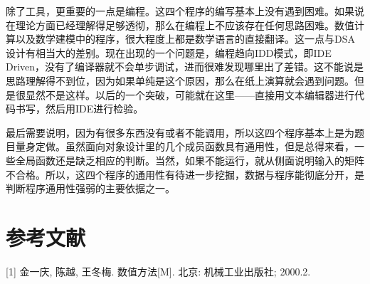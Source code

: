 除了工具，更重要的一点是编程。这四个程序的编写基本上没有遇到困难。如果说在理论方面已经理解得足够透彻，那么在编程上不应该存在任何思路困难。数值计算以及数学建模中的程序，很大程度上都是数学语言的直接翻译。这一点与DSA设计有相当大的差别。现在出现的一个问题是，编程趋向IDD模式，即IDE Driven，没有了编译器就不会单步调试，进而很难发现哪里出了差错。这不能说是思路理解得不到位，因为如果单纯是这个原因，那么在纸上演算就会遇到问题。但是很显然不是这样。以后的一个突破，可能就在这里——直接用文本编辑器进行代码书写，然后用IDE进行检验。

最后需要说明，因为有很多东西没有或者不能调用，所以这四个程序基本上是为题目量身定做。虽然面向对象设计里的几个成员函数具有通用性，但是总得来看，一些全局函数还是缺乏相应的判断。当然，如果不能运行，就从侧面说明输入的矩阵不合格。所以，这四个程序的通用性有待进一步挖掘，数据与程序能彻底分开，是判断程序通用性强弱的主要依据之一。


\section{参考文献}

[1] 金一庆, 陈越, 王冬梅. 数值方法[M]. 北京: 机械工业出版社; 2000.2.
